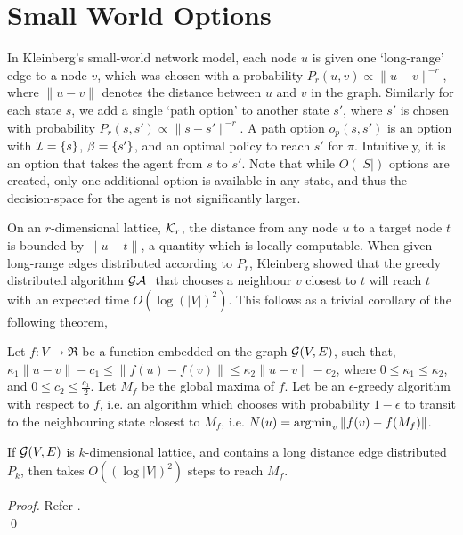 \section{Small World Options}
\label{sec:theory}

In Kleinberg's small-world network model, each node $u$ is given one
`long-range' edge to a node $v$, which was chosen with a probability
$P_r(u,v) \propto \|u-v\|^{-r}$, where $\|u-v\|$ denotes the distance
between $u$ and $v$ in the graph. Similarly for each state $s$, we add
a single `path option' to another state $s'$, where $s'$ is chosen with
probability $P_r(s,s') \propto \|s-s'\|^{-r}$. A path option $o_p(s,s')$
is an option with $\mathcal{I} = \{s\}$, $\beta = \{s'\}$, and an
optimal policy to reach $s'$ for $\pi$. Intuitively, it is an option
that takes the agent from $s$ to $s'$. Note that while $O(|S|)$ options
are created, only one additional option is available in any state, and
thus the decision-space for the agent is not significantly larger.

On an $r$-dimensional lattice, $\mathcal{K}_r$, the distance from any node
$u$ to a target node $t$ is bounded by $\|u-t\|$, a quantity which is
locally computable. When given long-range edges distributed according to
$P_r$, Kleinberg showed that the greedy distributed algorithm
$\mathcal{GA}~$ that chooses a neighbour $v$ closest to $t$ will reach $t$
with an expected time $O(\log(|V|)^2)$. This follows as a trivial
corollary of the following theorem,

\begin{theorem}
    \label{thm:small-world}
    Let $f : V \to \Re$ be a function embedded on the graph
    $\mathcal{G}(V,E)$, such that, $\kappa_1 \|u-v\| - c_1 \le \|f(u)
    - f(v)\| \le \kappa_2 \|u - v\| - c_2$, where $0 \le \kappa_1 \le
    \kappa_2$, and $0 \le c_2 \le \frac{c_1}{2}$. Let $M_f$ be the
    global maxima of $f$. Let \egreedyalgo be an $\epsilon$-greedy
    algorithm with respect to $f$, i.e.  an algorithm which chooses with
    probability $1-\epsilon$ to transit to the neighbouring state
    closest to $M_f$, i.e. $N(u) = \operatorname{argmin}_v \|f(v) - f(M_f)\|$.
    
    If $\mathcal{G}(V,E)$ is $k$-dimensional lattice, and contains a long
    distance edge distributed $P_k$, then \egreedyalgo takes $O( (\log
    |V|)^2 )$ steps to reach $M_f$.
\end{theorem}
\begin{proof}
    Refer .
    \\ \qed
\end{proof}

